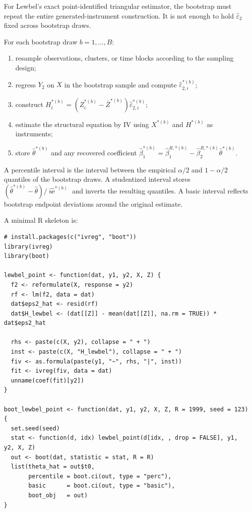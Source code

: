\documentclass[11pt]{article}
\newcommand{\se}{\operatorname{se}}
\theoremstyle{plain}
\theoremstyle{definition}
\theoremstyle{remark}
\begin{document}
For Lewbel's exact point-identified triangular estimator, the bootstrap must
repeat the entire generated-instrument construction.  It is not enough to hold
$\hat\varepsilon_2$ fixed across bootstrap draws.

For each bootstrap draw $b=1,\dots,B$:
\begin{enumerate}
    \item resample observations, clusters, or time blocks according to the
    sampling design;
    \item regress $Y_2$ on $X$ in the bootstrap sample and compute
    $\hat\varepsilon_{2,i}^{*(b)}$;
    \item construct $H_i^{*(b)}=(Z_i^{*(b)}-\bar Z^{*(b)})
    \hat\varepsilon_{2,i}^{*(b)}$;
    \item estimate the structural equation by IV using $X^{*(b)}$ and
    $H^{*(b)}$ as instruments;
    \item store $\hat\theta^{*(b)}$ and any recovered coefficient
    $\hat\beta_1^{*(b)}=\hat\beta_1^{R,*(b)}-
    \hat\beta_2^{R,*(b)}\hat\theta^{*(b)}$.
\end{enumerate}
A percentile interval is the interval between the empirical $\alpha/2$ and
$1-\alpha/2$ quantiles of the bootstrap draws.  A studentized interval stores
$(\hat\theta^{*(b)}-\hat\theta)/\widehat{\se}^{*(b)}$ and inverts the resulting
quantiles.  A basic interval reflects bootstrap endpoint deviations around the
original estimate.

A minimal R skeleton is:

\begin{verbatim}
# install.packages(c("ivreg", "boot"))
library(ivreg)
library(boot)

lewbel_point <- function(dat, y1, y2, X, Z) {
  f2 <- reformulate(X, response = y2)
  rf <- lm(f2, data = dat)
  dat$eps2_hat <- resid(rf)
  dat$H_lewbel <- (dat[[Z]] - mean(dat[[Z]], na.rm = TRUE)) * dat$eps2_hat

  rhs <- paste(c(X, y2), collapse = " + ")
  inst <- paste(c(X, "H_lewbel"), collapse = " + ")
  fiv <- as.formula(paste(y1, "~", rhs, "|", inst))
  fit <- ivreg(fiv, data = dat)
  unname(coef(fit)[y2])
}

boot_lewbel_point <- function(dat, y1, y2, X, Z, R = 1999, seed = 123) {
  set.seed(seed)
  stat <- function(d, idx) lewbel_point(d[idx, , drop = FALSE], y1, y2, X, Z)
  out <- boot(dat, statistic = stat, R = R)
  list(theta_hat = out$t0,
       percentile = boot.ci(out, type = "perc"),
       basic      = boot.ci(out, type = "basic"),
       boot_obj   = out)
}
\end{verbatim}
\end{document}

